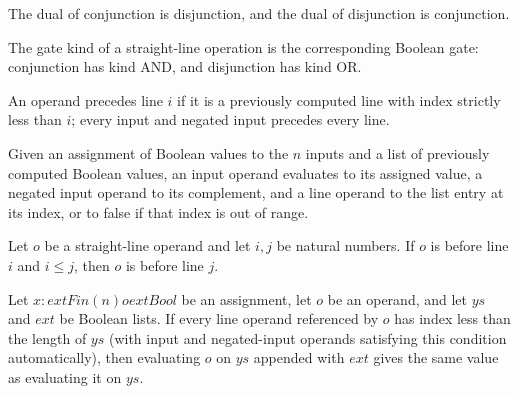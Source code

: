 \begin{definition}
\label{BoolCircuit.SLOp.dual}
\leanok
{}
The dual of conjunction is disjunction, and the dual of disjunction is conjunction.
\end{definition}

\begin{definition}
\label{BoolCircuit.SLOp.kind}
\leanok
{}
The gate kind of a straight-line operation is the corresponding Boolean gate:
conjunction has kind AND, and disjunction has kind OR.
\end{definition}

\begin{definition}
\label{BoolCircuit.SLOperand.Before}
\leanok
{}
An operand precedes line $i$ if it is a previously computed line with index strictly
less than $i$; every input and negated input precedes every line.
\end{definition}

\begin{definition}
\label{BoolCircuit.SLOperand.eval}
\leanok
{}
Given an assignment of Boolean values to the $n$ inputs and a list of previously
computed Boolean values, an input operand evaluates to its assigned value, a negated
input operand to its complement, and a line operand to the list entry at its index, or
to false if that index is out of range.
\end{definition}

\begin{theorem}
\label{BoolCircuit.SLOperand.Before.mono}
\leanok
{}
Let $o$ be a straight-line operand and let $i,j$ be natural numbers. If $o$ is before
line $i$ and $i\le j$, then $o$ is before line $j$.
\end{theorem}

\begin{theorem}
\label{BoolCircuit.SLOperand.eval_append}
\leanok
{}
Let $x:	ext{Fin}(n)	o	ext{Bool}$ be an assignment, let $o$ be an operand, and let $ys$
and $ext$ be Boolean lists. If every line operand referenced by $o$ has index less than
the length of $ys$ (with input and negated-input operands satisfying this condition
automatically), then evaluating $o$ on $ys$ appended with $ext$ gives the same value as
evaluating it on $ys$.
\end{theorem}

